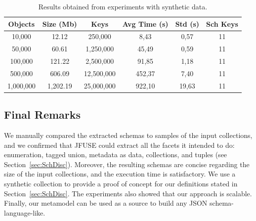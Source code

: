 \begin{table}[!hbt]
\centering
\small
\caption{Results obtained from experiments with synthetic data.}
\begin{tabular}{|c|c|c|c|c|c|}
\hline
\textbf{Objects} & \textbf{Size (Mb)} & \textbf{Keys} & \textbf{Avg Time (s)} & \textbf{Std (s)} & \textbf{Sch Keys} \\ \hline
10,000           & 12.12              & 250,000       & 8,43              & 0,57   &  11        \\ \hline
50,000           & 60.61              & 1,250,000     & 45,49             & 0,59   &   11       \\ \hline
100,000          & 121.22             & 2,500,000     & 91,85             & 1,18   &   11     \\ \hline
500,000          & 606.09             & 12,500,000    & 452,37            & 7,40   &   11       \\ \hline
1,000,000        & 1,202.19           & 25,000,000    & 922,10            & 19,63  &  11        \\ \hline
\end{tabular}
\label{tab:ComparaSyn}
\end{table}

\subsection{Final Remarks}

We manually compared the extracted schemas to  samples of the input collections, and we confirmed that   
JFUSE could extract all the facets it intended to do: enumeration, tagged union, metadata as data, collections, and tuples (see Section~\ref{sec:SchDisc}). 
Moreover, the resulting schemas are concise regarding the size of the input collections, and the execution time is satisfactory. 
We use a synthetic collection to provide a proof of concept for our definitions stated in Section~\ref{sec:SchDisc}. 
The experiments also showed that our approach is scalable. 
Finally, our metamodel can be used as a source to build any JSON schema-language-like.
